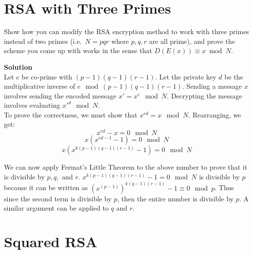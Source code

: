 \documentclass[11pt]{article}
\newcommand*{\Question}[1]{\section{#1}}
\newenvironment{Answer}{\vspace{10pt}\begin{mdframed}\textbf{Solution}\\}{\end{mdframed}\vfill\pagebreak[3]}
\newenvironment{Answer}{\vspace{10pt}}{\vfill\pagebreak[3]}
\begin{document}
\Question{RSA with Three Primes}
Show how you can modify the RSA encryption method to work with three primes instead of two primes (i.e.\ $N=pqr$ where $p, q, r$ are all prime), and prove the scheme you come up with works in the sense that $D(E(x)) \equiv x \bmod N$.
\begin{Answer}
    Let $e$ be co-prime with $(p-1)(q-1)(r-1)$. Let the private key $d$ be the multiplicative inverse of $e \mod (p-1)(q-1)(r-1)$. Sending a message $x$ involves sending the encoded message $x'=x^e \mod N$. Decrypting the message involves evaluating $x'^d \mod N$.
    \\
    To prove the correctness, we must show that $x^{ed}=x \mod N$. Rearranging, we get:
    $$ x^{ed}-x=0 \mod N$$
     $$ x(x^{ed-1}-1)=0 \mod N$$
    $$ x(x^{k(p-1)(q-1)(r-1)}-1)=0 \mod N$$
    
    We can now apply Fermat's Little Theorem to the above number to prove that it is divisible by $p, q,$ and $r$. $x^{k(p-1)(q-1)(r-1)}-1=0 \mod N$ is divisible by $p$ because it can be written as $(x^{(p-1)})^{k(q-1)(r-1)}-1 \equiv 0 \mod p$. Thus since the second term is divisible by $p$, then the entire number is divisible by $p$. A similar argument can be applied to $q$ and $r$.
\end{Answer}


\Question{Squared RSA}
\end{document}
